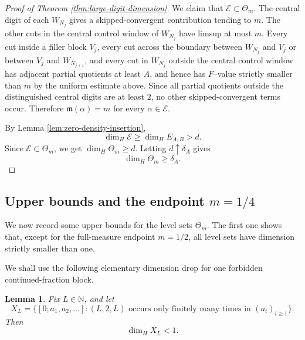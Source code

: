 \documentclass[11pt]{amsart}
\newtheorem{lemma}[theorem]{Lemma}
\newcommand{\N}{\mathbb N}
\begin{document}
\begin{proof}[Proof of Theorem \ref{thm:large-digit-dimension}]
We claim that $\mathcal E\subset\Theta_m$.  The central digit of each $W_{N_j}$ gives a skipped-convergent contribution tending to $m$.  The other cuts in the central control window of $W_{N_j}$ have limsup at most $m$.  Every cut inside a filler block $V_j$, every cut across the boundary between $W_{N_j}$ and $V_j$ or between $V_j$ and $W_{N_{j+1}}$, and every cut in $W_{N_j}$ outside the central control window has adjacent partial quotients at least $A$, and hence has $F$--value strictly smaller than $m$ by the uniform estimate above.  Since all partial quotients outside the distinguished central digits are at least $2$, no other skipped-convergent terms occur.  Therefore $\mathfrak m(\alpha)=m$ for every $\alpha\in\mathcal E$.

By Lemma \ref{lem:zero-density-insertion},
$$
        \dim_H\mathcal E
        \ge
        \dim_H E_{A,B}
        >d.
$$
Since $\mathcal E\subset\Theta_m$, we get $\dim_H\Theta_m\ge d$.  Letting $d\uparrow\delta_A$ gives
$$
        \dim_H\Theta_m\ge\delta_A.
$$
\end{proof}



\subsection{Upper bounds and the endpoint $m=1/4$}\label{sec:dimension}

We now record some upper bounds for the level sets $\Theta_m$. The first one shows that, except for the full-measure endpoint $m=1/2$, all level sets have dimension strictly smaller than one.

We shall use the following elementary dimension drop for one forbidden
continued-fraction block.

\begin{lemma}\label{lem:L2L-dimension-drop}
Fix $L\in\N$, and let
$$
X_L=
\{[0;a_1,a_2,\ldots]:(L,2,L)\text{ occurs only finitely many times in }
(a_i)_{i\ge1}\}.
$$
Then
$$
\dim_H X_L<1.
$$
\end{lemma}
\end{document}
